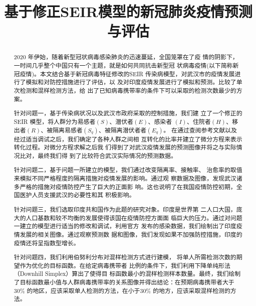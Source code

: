\documentclass[withoutpre]{cumcmthesis} %
\title{基于修正SEIR模型的新冠肺炎疫情预测与评估}
\begin{document}
 \maketitle
 \begin{abstract}
    2020 年伊始，随着新型冠状病毒感染肺炎的迅速蔓延，全国笼罩在了疫
    情的阴影下，一时间几乎整个中国只有一个主题，就是如何共同抗击新型冠
    状病毒疫情(以下简称新冠疫情)。本文结合基于新冠病毒特征修改的SEIR
    传染病模型，对武汉市的疫情发展进行了模拟和对防控措施进行了评估，以
    及对印度疫情发展进行了模拟和预测。比较了单次检测和混样检测方法，给
    出了已知病毒携带率的条件下可以采取的检测次数最少的方案。

    针对问题一，基于传染病状况以及武汉市政府采取的控制措施，我们建
    立了一个修正的SEIR 模型，将人群分为易感者$(S)$、潜伏者$(E)$、感染者
    $(I)$、住院者$(H)$、移出者$(R)$、被隔离易感者$(S_q)$、被隔离潜伏者者$(E_q)$。
    在通过查阅参考文献以及经过适当调试之后，我们确定了各种人群之间相
    互转化的比率并建立了微分方程来表示转化过程。对微分方程求解之后我
    们得到了对武汉疫情发展的预测图像并将之与实际情况比对，最终我们得
    到了比较符合武汉实际情况的预测数据。

    针对问题二，基于问题一所建立的模型，我们通过改变隔离率、接触率、
    治愈率的取值来模拟不同严格程度的隔离措施对疫情发展的影响。通过观
    察数据及图像，发现武汉诸多严格的措施对疫情防控产生了巨大的正面影
    响。这也说明了在我国疫情防控初期，全国医护人员支援武汉的必要性和其
    积极影响。

    针对问题三，我们选取印度共和国作为此题的研究对象。印度是世界第
    二人口大国，庞大的人口基数和较不均衡的发展使得该国在疫情防控方面面
    临巨大的压力。通过对问题一建立的模型进行适当的修改和调试，利用官方
    发布的感染数据，我们绘制出了印度疫情发展的相关图像。通过观察预测数
    据和图像，我们发现如果不加强防控措施，印度的疫情还将呈指数型增长。

    针对问题四，我们利用伯努利分布对混样检测方式进行建模，
    将单人所需检测次数的期望作为优化的目标函数。在给定病毒携带者
    比例的条件下，我们利用下降单纯形法（Downhill Simplex）算出了使得目
    标函数最小的混样检测样本数量。最终，我们绘制了目标函数最小值与人群病毒携带率的关系图像并得出结论：在预期病毒携带者大于30\% 的地区，应该采取单人检测的方法，在小于30\% 的地方，应该采取混样检测的方法。

\end{abstract}

\end{document}
